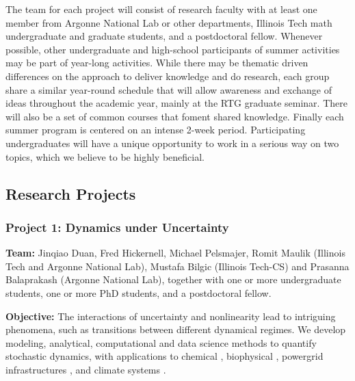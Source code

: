 \documentclass[11pt]{article}
\begin{document}
  

 The team for each project will consist of research faculty with at least one member
from Argonne National Lab or other departments, Illinois Tech math undergraduate and graduate students, and a postdoctoral
fellow. Whenever possible, other undergraduate and high-school participants of summer activities
may be part of year-long activities. While there  
 may be thematic driven differences on the approach to deliver
knowledge and do research, each group share a similar year-round schedule that will allow awareness
and exchange of ideas throughout the academic year, mainly at the RTG graduate seminar. There will also
be a set of common courses that foment shared knowledge. Finally each summer program is centered on
an intense 2-week period. Participating undergraduates will have a unique opportunity to work in a serious
way on two topics, which we believe to be highly beneficial.


\subsection{Research Projects}


\subsubsection*{Project 1: Dynamics  under Uncertainty} 

{\bf Team:} Jinqiao Duan, Fred Hickernell, Michael Pelsmajer, Romit Maulik (Illinois Tech and Argonne National Lab),  
 Mustafa Bilgic (Illinois Tech-CS) and Prasanna Balaprakash (Argonne National Lab), together with one or more undergraduate students, one or more PhD students, and a postdoctoral fellow.  

{\bf Objective:} The interactions of uncertainty and nonlinearity lead to intriguing phenomena, such as  transitions   between  different dynamical regimes. We develop modeling, analytical, computational and data science  methods to quantify     stochastic dynamics, with applications to chemical \cite{agaoglou_chemical_2019}, biophysical \cite{Ruoff2018BiologicalCR}, powergrid infrastructures \cite{MEDJROUBI201714}, and climate systems \cite{Alexandrov2020NonlinearCD, franzke_o'kane_2017, Wan2020ADF}. 
 
 
 
\end{document}
